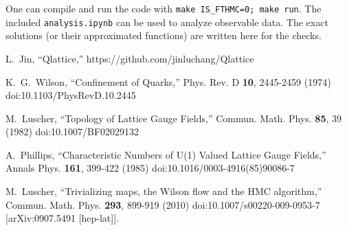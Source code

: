 \documentclass[12pt]{article}
\begin{document}
One can compile and run the code with {\tt make IS\_FTHMC=0; make run}.
The included {\tt analysis.ipynb} can be used to analyze observable data. The exact solutions (or their approximated functions) are written here for the checks.







\normalbaselineskip

\begin{thebibliography}{99}
  \setlength{\itemsep}{-2pt}

  L.~Jin,
  ``Qlattice,''
  https://github.com/jinluchang/Qlattice

K.~G.~Wilson,
``Confinement of Quarks,''
Phys. Rev. D \textbf{10}, 2445-2459 (1974)
doi:10.1103/PhysRevD.10.2445

M.~Luscher,
``Topology of Lattice Gauge Fields,''
Commun. Math. Phys. \textbf{85}, 39 (1982)
doi:10.1007/BF02029132

A.~Phillips,
``Characteristic Numbers of U(1) Valued Lattice Gauge Fields,''
Annals Phys. \textbf{161}, 399-422 (1985)
doi:10.1016/0003-4916(85)90086-7

M.~Luscher,
``Trivializing maps, the Wilson flow and the HMC algorithm,''
Commun. Math. Phys. \textbf{293}, 899-919 (2010)
doi:10.1007/s00220-009-0953-7
[arXiv:0907.5491 [hep-lat]].


\end{thebibliography}
\end{document}
